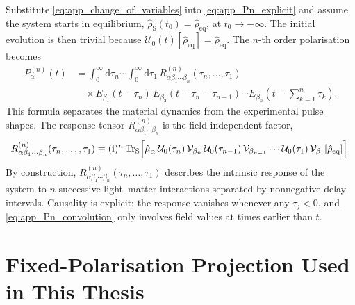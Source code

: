 Substitute \autoref{eq:app_change_of_variables} into \autoref{eq:app_Pn_explicit} and assume the system starts in equilibrium, $\hat{\rho}_{\mathrm{S}}(t_0)=\hat{\rho}_{\mathrm{eq}}$, at $t_0\to -\infty$. The initial evolution is then trivial because $\mathcal{U}_0(t)[\hat{\rho}_{\mathrm{eq}}]=\hat{\rho}_{\mathrm{eq}}$. The $n$-th order polarisation becomes
\begin{equation}
\begin{split}
P^{(n)}_\alpha(t)
&= \int_{0}^{\infty}\!\mathrm{d}\tau_n\cdots\int_{0}^{\infty}\!\mathrm{d}\tau_1\,
R^{(n)}_{\alpha\beta_1\cdots\beta_n}(\tau_n,\ldots,\tau_1)
\\
&\quad \times
E_{\beta_1}(t-\tau_n)\,
E_{\beta_2}(t-\tau_n-\tau_{n-1})\cdots
E_{\beta_n}\!\left(t-\sum_{k=1}^{n}\tau_k\right).
\end{split}
\label{eq:app_Pn_convolution}
\end{equation}
This formula separates the material dynamics from the experimental pulse shapes. The response tensor $R^{(n)}_{\alpha\beta_1\cdots\beta_n}$ is the field-independent factor,
\begin{equation*}
	R^{(n)}_{\alpha\beta_1\cdots\beta_n}(\tau_n,\ldots,\tau_1)
	\equiv (\mathrm{i})^n\,\mathrm{Tr}_{\mathrm{S}}\Bigl[\hat{\mu}_\alpha\,\mathcal{U}_0(\tau_n)\,\mathcal{V}_{\beta_n}\,\mathcal{U}_0(\tau_{n-1})\,\mathcal{V}_{\beta_{n-1}}\cdots\mathcal{U}_0(\tau_1)\,\mathcal{V}_{\beta_1}[\hat{\rho}_{\mathrm{eq}}]\Bigr].
\end{equation*}
By construction, $R^{(n)}_{\alpha\beta_1\cdots\beta_n}(\tau_n,\ldots,\tau_1)$ describes the intrinsic response of the system to $n$ successive light--matter interactions separated by nonnegative delay intervals. Causality is explicit: the response vanishes whenever any $\tau_j<0$, and \autoref{eq:app_Pn_convolution} only involves field values at times earlier than $t$.

\section{Fixed-Polarisation Projection Used in This Thesis}
\label{app:sec:scalar_projection_note}

